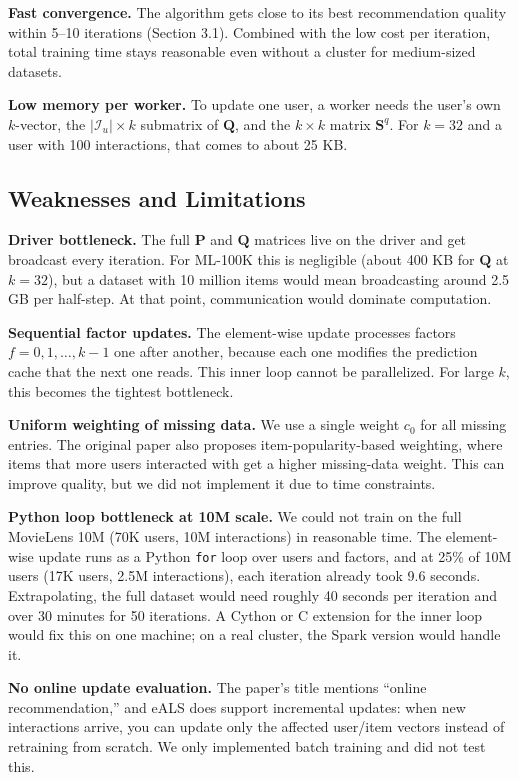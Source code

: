 \documentclass[11pt,a4paper]{article}
\begin{document}
\textbf{Fast convergence.} The algorithm gets close to its best recommendation quality within 5--10 iterations (Section 3.1). Combined with the low cost per iteration, total training time stays reasonable even without a cluster for medium-sized datasets.

\textbf{Low memory per worker.} To update one user, a worker needs the user's own $k$-vector, the $|\mathcal{I}_u| \times k$ submatrix of $\mathbf{Q}$, and the $k \times k$ matrix $\mathbf{S}^q$. For $k=32$ and a user with 100 interactions, that comes to about 25 KB.

\subsection{Weaknesses and Limitations}

\textbf{Driver bottleneck.} The full $\mathbf{P}$ and $\mathbf{Q}$ matrices live on the driver and get broadcast every iteration. For ML-100K this is negligible (about 400 KB for $\mathbf{Q}$ at $k=32$), but a dataset with 10 million items would mean broadcasting around 2.5 GB per half-step. At that point, communication would dominate computation.

\textbf{Sequential factor updates.} The element-wise update processes factors $f=0,1,\ldots,k-1$ one after another, because each one modifies the prediction cache that the next one reads. This inner loop cannot be parallelized. For large $k$, this becomes the tightest bottleneck.

\textbf{Uniform weighting of missing data.} We use a single weight $c_0$ for all missing entries. The original paper also proposes item-popularity-based weighting, where items that more users interacted with get a higher missing-data weight. This can improve quality, but we did not implement it due to time constraints.

\textbf{Python loop bottleneck at 10M scale.} We could not train on the full MovieLens 10M (70K users, 10M interactions) in reasonable time. The element-wise update runs as a Python \texttt{for} loop over users and factors, and at 25\% of 10M users (17K users, 2.5M interactions), each iteration already took 9.6 seconds. Extrapolating, the full dataset would need roughly 40 seconds per iteration and over 30 minutes for 50 iterations. A Cython or C extension for the inner loop would fix this on one machine; on a real cluster, the Spark version would handle it.

\textbf{No online update evaluation.} The paper's title mentions ``online recommendation,'' and eALS does support incremental updates: when new interactions arrive, you can update only the affected user/item vectors instead of retraining from scratch. We only implemented batch training and did not test this.
\end{document}
